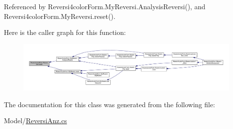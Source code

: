 Referenced by Reversi4color\+Form.\+My\+Reversi.\+Analysis\+Reversi(), and Reversi4color\+Form.\+My\+Reversi.\+reset().

Here is the caller graph for this function\+:\nopagebreak
\begin{figure}[H]
\begin{center}
\leavevmode
\includegraphics[width=350pt]{class_reversi4color_form_1_1_reversi_anz_abdb9398ace86376d2a9f1f82cf7a2113_icgraph}
\end{center}
\end{figure}


The documentation for this class was generated from the following file\+:\begin{DoxyCompactItemize}
\item 
Model/\hyperlink{_reversi_anz_8cs}{Reversi\+Anz.\+cs}\end{DoxyCompactItemize}
